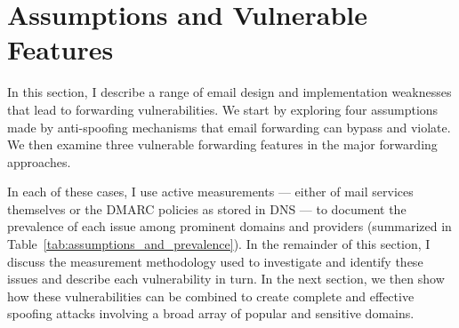 \section{Assumptions and Vulnerable Features}
\label{sec:assumptions}

In this section, I describe a range of email design and
implementation weaknesses that lead to forwarding vulnerabilities.
We start by exploring four assumptions made by anti-spoofing mechanisms
that email forwarding can bypass and violate.  We then examine
three vulnerable forwarding features in the major forwarding
approaches.

In each of these cases, I use active
measurements --- either of mail services themselves or the DMARC policies
as stored in DNS --- to document the prevalence of each issue
among prominent domains and
providers (summarized in Table~\ref{tab:assumptions_and_prevalence}).
In the remainder of this section, I discuss the measurement
methodology used to investigate and identify these issues and
describe each vulnerability in turn.  In the next section,
we then show how these vulnerabilities can
be combined to create complete and effective spoofing attacks
involving a broad array of popular and sensitive domains.





